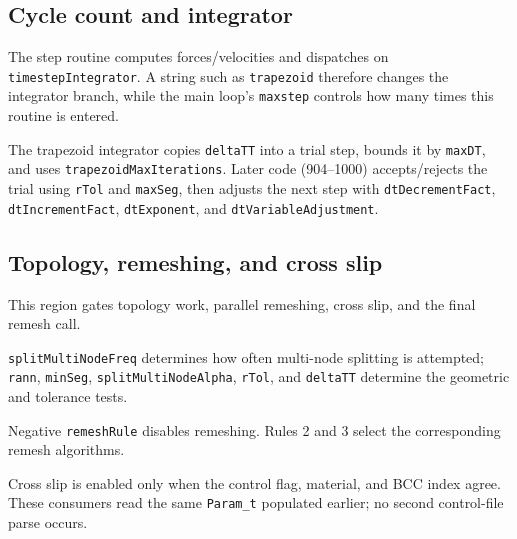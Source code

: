 \documentclass[11pt]{article}
\newcommand{\code}[1]{\texorpdfstring{\nolinkurl{#1}}{#1}}
\begin{document}
\subsection{Cycle count and integrator}

The step routine computes forces/velocities and dispatches on \code{timestepIntegrator}. A string such as \code{trapezoid} therefore changes the integrator branch, while the main loop's \code{maxstep} controls how many times this routine is entered.

The trapezoid integrator copies \code{deltaTT} into a trial step, bounds it by \code{maxDT}, and uses \code{trapezoidMaxIterations}. Later code (904--1000) accepts/rejects the trial using \code{rTol} and \code{maxSeg}, then adjusts the next step with \code{dtDecrementFact}, \code{dtIncrementFact}, \code{dtExponent}, and \code{dtVariableAdjustment}.

\subsection{Topology, remeshing, and cross slip}

This region gates topology work, parallel remeshing, cross slip, and the final remesh call.\

\code{splitMultiNodeFreq} determines how often multi-node splitting is attempted; \code{rann}, \code{minSeg}, \code{splitMultiNodeAlpha}, \code{rTol}, and \code{deltaTT} determine the geometric and tolerance tests.

Negative \code{remeshRule} disables remeshing. Rules 2 and 3 select the corresponding remesh algorithms.\

Cross slip is enabled only when the control flag, material, and BCC index agree. These consumers read the same \code{Param_t} populated earlier; no second control-file parse occurs.
\end{document}

